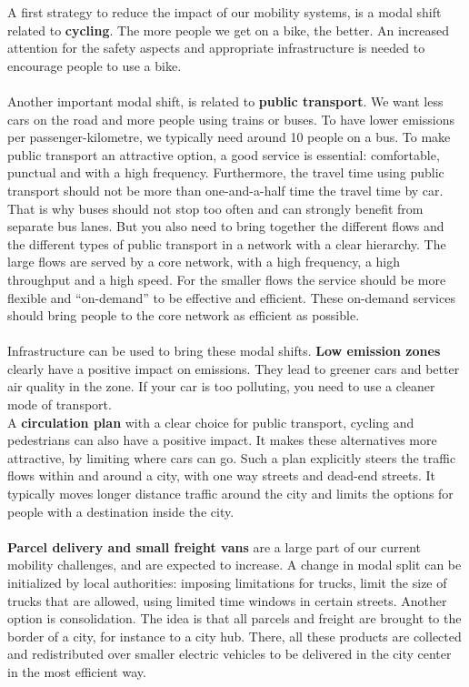 \documentclass[../summary.tex]{subfiles}
\begin{document}
	A first strategy to reduce the impact of our mobility systems, is a modal shift related to \textbf{cycling}. The more people we get on a bike, the better. An increased attention for the safety aspects and appropriate infrastructure is needed to encourage people to use a bike. 
	\\\\
	Another important modal shift, is related to \textbf{public transport}. We want less cars on the road and more people using trains or buses. To have lower emissions per passenger-kilometre, we typically need around 10 people on a bus. To make public transport an attractive option, a good service is essential: comfortable, punctual and with a high frequency. Furthermore, the travel time using public transport should not be more than one-and-a-half time the travel time by car. That is why buses should not stop too often and can strongly benefit from separate bus lanes. But you also need to bring together the different flows and the different types of public transport in a network with a clear hierarchy. The large flows are served by a core network, with a high frequency, a high throughput and a high speed. For the smaller flows the service should be more flexible and “on-demand” to be effective and efficient. These on-demand services should bring people to the core network as efficient as possible.
	\\\\
	Infrastructure can be used to bring these modal shifts. \textbf{Low emission zones} clearly have a positive impact on emissions. They lead to greener cars and better air quality in the zone. If your car is too polluting, you need to use a cleaner mode of transport.
	\\
	A \textbf{circulation plan} with a clear choice for public transport, cycling and pedestrians can also have a positive impact. It makes these alternatives more attractive, by limiting where cars can go. Such a plan explicitly steers the traffic flows within and around a city, with one way streets and dead-end streets. It typically moves longer distance traffic around the city and limits the options for people with a destination inside the city.
	\\\\
	\textbf{Parcel delivery and small freight vans} are a large part of our current mobility challenges, and are expected to increase. A change in modal split can be initialized by local authorities: imposing limitations for trucks, limit the size of trucks that are allowed, using limited time windows in certain streets. Another option is consolidation. The idea is that all parcels and freight are brought to the border of a city, for instance to a city hub. There, all these products are collected and redistributed over smaller electric vehicles to be delivered in the city center in the most efficient way.
\end{document}
